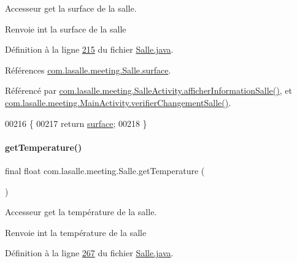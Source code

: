 Accesseur get la surface de la salle. 

\begin{DoxyReturn}{Renvoie}
int la surface de la salle 
\end{DoxyReturn}


Définition à la ligne \hyperlink{_salle_8java_source_l00215}{215} du fichier \hyperlink{_salle_8java_source}{Salle.\+java}.



Références \hyperlink{_salle_8java_source_l00038}{com.\+lasalle.\+meeting.\+Salle.\+surface}.



Référencé par \hyperlink{_salle_activity_8java_source_l00103}{com.\+lasalle.\+meeting.\+Salle\+Activity.\+afficher\+Information\+Salle()}, et \hyperlink{_main_activity_8java_source_l00291}{com.\+lasalle.\+meeting.\+Main\+Activity.\+verifier\+Changement\+Salle()}.


\begin{DoxyCode}
00216     \{
00217         \textcolor{keywordflow}{return} \hyperlink{classcom_1_1lasalle_1_1meeting_1_1_salle_a1b761514679fa5f98e71809fea448384}{surface};
00218     \}
\end{DoxyCode}
\mbox{\label{classcom_1_1lasalle_1_1meeting_1_1_salle_ae3235f548f8bc7ab4d05ff38ec762e77}} 
\paragraph{\texorpdfstring{get\+Temperature()}{getTemperature()}}
{\footnotesize\ttfamily final float com.\+lasalle.\+meeting.\+Salle.\+get\+Temperature (\begin{DoxyParamCaption}{ }\end{DoxyParamCaption})}



Accesseur get la température de la salle. 

\begin{DoxyReturn}{Renvoie}
int la température de la salle 
\end{DoxyReturn}


Définition à la ligne \hyperlink{_salle_8java_source_l00267}{267} du fichier \hyperlink{_salle_8java_source}{Salle.\+java}.



